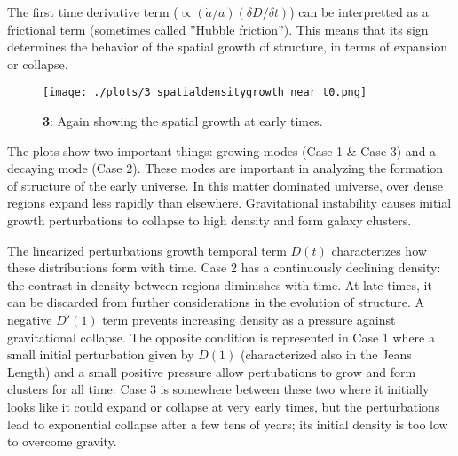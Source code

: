 The first time derivative term ($\propto (\dot{a}/a)(\delta D /\delta t)$) can be interpretted as a frictional term (sometimes called ''Hubble friction''). This means that its sign determines the behavior of the spatial growth of structure, in terms of expansion or collapse.


\begin{figure}[h!]
  \centering
  \texttt{[image: ./plots/3\_spatialdensitygrowth\_near\_t0.png]}
  \caption{\textbf{3}: Again showing the spatial growth at early times.}
  \label{fig:spatialdensitygrowtht0}
\end{figure}


The plots show two important things: growing modes (Case 1 \& Case 3) and a decaying mode (Case 2). These modes are important in analyzing the formation of structure of the early universe. In this matter dominated universe, over dense regions expand less rapidly than elsewhere. Gravitational instability causes initial growth perturbations to collapse to high density and form galaxy clusters.

The linearized perturbations growth temporal term $D(t)$ characterizes how these distributions form with time. Case 2 has a continuously declining density: the contrast in density between regions diminishes with time. At late times, it can be discarded from further considerations in the evolution of structure. A negative $D'(1)$ term prevents increasing density as a pressure against gravitational collapse. The opposite condition is represented in Case 1 where a small initial perturbation given by $D(1)$ (characterized also in the Jeans Length) and a small positive pressure allow pertubations to grow and form clusters for all time. Case 3 is somewhere between these two where it initially looks like it could expand or collapse at very early times, but the perturbations lead to exponential collapse after a few tens of years; its initial density is too low to overcome gravity.

